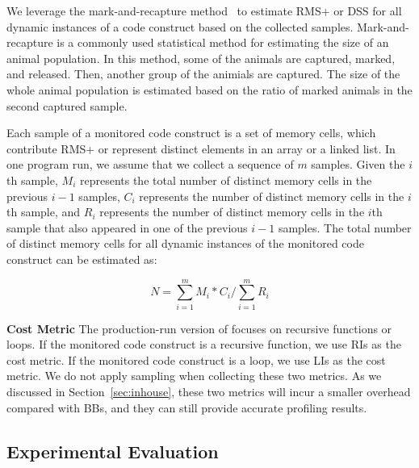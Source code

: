 We leverage the mark-and-recapture method~\citep{mark-recapture} to 
estimate RMS+ or DSS for all dynamic instances of a code construct 
based on the collected samples. 
Mark-and-recapture is a commonly used statistical method 
for estimating the size of an animal population. 
In this method, some of the animals are captured, marked, and released. 
Then, another group of the animials are captured.
The size of the whole animal population is estimated 
based on the ratio of marked animals in the second captured sample.  


Each sample of a monitored code construct is a set of memory cells, 
which contribute RMS+ or represent distinct elements in an array or a linked list. 
In one program run, we assume that we collect a sequence of $m$ samples. 
Given the $i$th sample, $M_i$ represents the 
total number of distinct memory cells in the previous $i-1$ samples, 
$C_i$ represents the number of distinct memory cells in the $i$th sample,
and $R_i$ represents the number of distinct memory cells in 
the $i$th sample that also appeared in one of the previous $i-1$ samples.
The total number of distinct memory cells for all dynamic instances 
of the monitored code construct can be estimated as:



\begin{equation} \label{eq:mark}
N = \sum\limits_{i=1}^m M_i*C_i\Big/\sum\limits_{i=1}^m R_i
\end{equation}

\noindent\textbf{Cost Metric}
The production-run version of \Tool focuses on recursive functions or loops.
If the monitored code construct is a recursive function,
we use RIs as the cost metric.
If the monitored code construct is a loop, 
we use LIs as the cost metric. 
We do not apply sampling when collecting these two metrics. 
As we discussed in Section~\ref{sec:inhouse},
these two metrics will incur a smaller overhead compared with BBs, 
and they can still provide accurate profiling results.  


\subsection{Experimental Evaluation}

